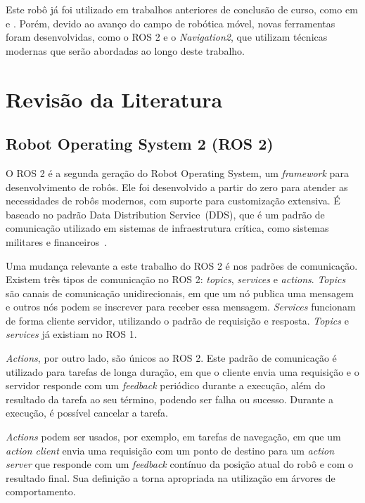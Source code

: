 \documentclass[repeatfields,xlists,xpacks,oneside,yearsonly]{ufrgscca}
\begin{document}
Este robô já foi utilizado em trabalhos anteriores de conclusão de curso,
como em \textcite{petry_tcc} e \textcite{rahul_tcc}.
Porém, devido ao avanço do campo de robótica móvel, novas ferramentas
foram desenvolvidas, como o ROS 2 e o \textit{Navigation2}, que utilizam
técnicas modernas que serão abordadas ao longo deste trabalho.

\chapter{Revisão da Literatura}
\label{revisao}

\section{Robot Operating System 2 (ROS 2)}

O ROS 2 é a segunda geração do Robot Operating System,
um \textit{framework} para desenvolvimento de robôs.
Ele foi desenvolvido a partir do zero para atender as necessidades de robôs modernos,
com suporte para customização extensiva.
É baseado no padrão Data Distribution Service~(DDS), que é um padrão de comunicação utilizado
em sistemas de infraestrutura crítica, como sistemas militares e financeiros~\cite{ROS2Article}.

Uma mudança relevante a este trabalho do ROS 2 é nos padrões de comunicação.
Existem três tipos de comunicação no ROS 2: \textit{topics}, \textit{services} e \textit{actions}.
\textit{Topics} são canais de comunicação unidirecionais, em que um nó publica uma mensagem
e outros nós podem se inscrever para receber essa mensagem.
\textit{Services} funcionam de forma cliente servidor, utilizando o padrão de requisição e resposta.
\textit{Topics} e \textit{services} já existiam no ROS 1.

\textit{Actions}, por outro lado, são únicos ao ROS 2.
Este padrão de comunicação é utilizado para tarefas de longa duração,
em que o cliente envia uma requisição e o servidor responde com um \textit{feedback} periódico
durante a execução, além do resultado da tarefa ao seu término, podendo ser falha ou sucesso.
Durante a execução, é possível cancelar a tarefa.

\textit{Actions} podem ser usados, por exemplo, em tarefas de navegação, em que um \textit{action client}
envia uma requisição com um ponto de destino para um \textit{action server}
que responde com um \textit{feedback} contínuo da posição atual do robô e
com o resultado final.
Sua definição a torna apropriada na utilização em árvores de comportamento.
\end{document}

